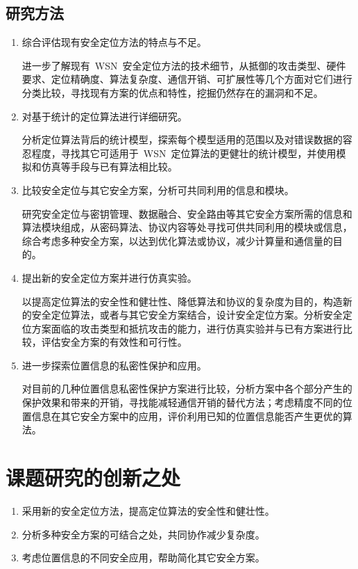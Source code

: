 \documentclass[a4paper,10pt]{article}
\begin{document}
\subsection{研究方法}

\begin{enumerate}

\item 综合评估现有安全定位方法的特点与不足。

进一步了解现有~WSN~安全定位方法的技术细节，从抵御的攻击类型、硬件要求、定位精确度、算法复杂度、通信开销、可扩展性等几个方面对它们进行分类比较，寻找现有方案的优点和特性，挖掘仍然存在的漏洞和不足。

\item 对基于统计的定位算法进行详细研究。

分析定位算法背后的统计模型，探索每个模型适用的范围以及对错误数据的容忍程度，寻找其它可适用于~WSN~定位算法的更健壮的统计模型，并使用模拟和仿真等手段与已有算法相比较。

\item 比较安全定位与其它安全方案，分析可共同利用的信息和模块。

研究安全定位与密钥管理、数据融合、安全路由等其它安全方案所需的信息和算法模块组成，从密码算法、协议内容等处寻找可供共同利用的模块或信息，综合考虑多种安全方案，以达到优化算法或协议，减少计算量和通信量的目的。

\item 提出新的安全定位方案并进行仿真实验。

以提高定位算法的安全性和健壮性、降低算法和协议的复杂度为目的，构造新的安全定位算法，或者与其它安全方案结合，设计安全定位方案。分析安全定位方案面临的攻击类型和抵抗攻击的能力，进行仿真实验并与已有方案进行比较，评估安全方案的有效性和可行性。

\item 进一步探索位置信息的私密性保护和应用。

对目前的几种位置信息私密性保护方案进行比较，分析方案中各个部分产生的保护效果和带来的开销，寻找能减轻通信开销的替代方法；考虑精度不同的位置信息在其它安全方案中的应用，评价利用已知的位置信息能否产生更优的算法。

\end{enumerate}

\section{课题研究的创新之处}

\begin{enumerate}
\item 采用新的安全定位方法，提高定位算法的安全性和健壮性。
\item 分析多种安全方案的可结合之处，共同协作减少复杂度。
\item 考虑位置信息的不同安全应用，帮助简化其它安全方案。
\end{enumerate}
\end{document}
